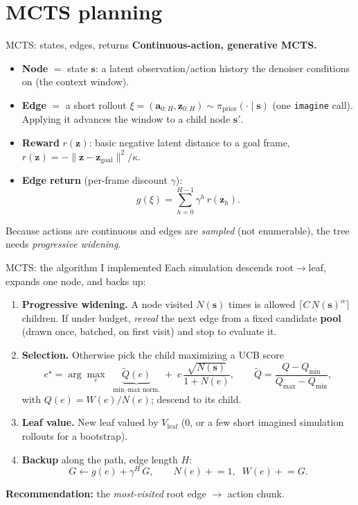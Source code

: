 \documentclass[aspectratio=169]{beamer}
\newcommand{\act}{\bm{a}}
\newcommand{\state}{\bm{s}}
\newcommand{\zlat}{\bm{z}}
\newcommand{\prior}{\pi_{\mathrm{prior}}}
\begin{document}
\section{MCTS planning}
\begin{frame}{MCTS: states, edges, returns}
  \textbf{Continuous-action, generative MCTS.}
  \begin{itemize}
    \item \textbf{Node} $=$ state $\state$: a latent observation/action history
      the denoiser conditions on (the context window).
    \item \textbf{Edge} $=$ a short rollout $\xi=(\act_{0:H},\zlat_{0:H})\sim
      \prior(\cdot\mid\state)$ (one \texttt{imagine} call). Applying it advances
      the window to a child node $\state'$.
    \item \textbf{Reward} $r(\zlat)$: basic negative latent distance to a goal
      frame, $r(\zlat)=-\lVert\zlat-\zlat_{\mathrm{goal}}\rVert^2/\kappa$.
    \item \textbf{Edge return} (per-frame discount $\gamma$):
      \[ g(\xi)=\sum_{h=0}^{H-1}\gamma^{h}\,r(\zlat_h). \]
  \end{itemize}
  Because actions are continuous and edges are \emph{sampled} (not enumerable),
  the tree needs \emph{progressive widening}.
\end{frame}

\begin{frame}{MCTS: the algorithm I implemented}
  Each simulation descends root$\to$leaf, expands one node, and backs up:
  \begin{enumerate}\small
    \item \textbf{Progressive widening.} A node visited $N(\state)$ times is
      allowed $\big\lceil C\,N(\state)^{\alpha}\big\rceil$ children. If under
      budget, \emph{reveal} the next edge from a fixed candidate \textbf{pool}
      (drawn once, batched, on first visit) and stop to evaluate it.
    \item \textbf{Selection.} Otherwise pick the child maximizing a UCB score
      \[
        e^\star=\arg\max_{e}\;\;
        \underbrace{\widetilde{Q}(e)}_{\text{min--max norm.}}
        \;+\;c\,\frac{\sqrt{N(\state)}}{1+N(e)},\qquad
        \widetilde Q=\frac{Q-Q_{\min}}{Q_{\max}-Q_{\min}},
      \]
      with $Q(e)=W(e)/N(e)$; descend to its child.
    \item \textbf{Leaf value.} New leaf valued by $V_{\text{leaf}}$
      ($0$, or a few short imagined simulation rollouts for a bootstrap).
    \item \textbf{Backup} along the path, edge length $H$:
      \[ G \leftarrow g(e)+\gamma^{H}\,G,\qquad
         N(e)\!\mathrel{+}=\!1,\;\; W(e)\!\mathrel{+}=\!G. \]
  \end{enumerate}
  \textbf{Recommendation:} the \emph{most-visited} root edge $\to$ action chunk.
\end{frame}
\end{document}
